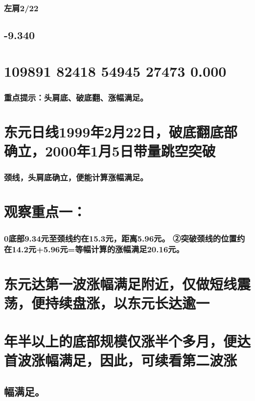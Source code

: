 \documentclass{article}
\begin{document}
\subsubsection{左肩2/22}

\subsection{-9.340}

\section{109891 82418 54945 27473 0.000}

\subsubsection{重点提示：头肩底、破底翻、涨幅满足。}

\section{东元日线1999年2月22日，破底翻底部确立，2000年1月5日带量跳空突破}

\subsubsection{颈线，头肩底确立，便能计算涨幅满足。}

\section{观察重点一：}

\subsubsection{0底部9.34元至颈线约在15.3元，距离5.96元。 ②突破颈线的位置约在14.2元+5.96元=等幅计算的涨幅满足20.16元。}

\section{东元达第一波涨幅满足附近，仅做短线震荡，便持续盘涨，以东元长达逾一}

\section{年半以上的底部规模仅涨半个多月，便达首波涨幅满足，因此，可续看第二波涨}

\subsection{幅满足。}
\end{document}
